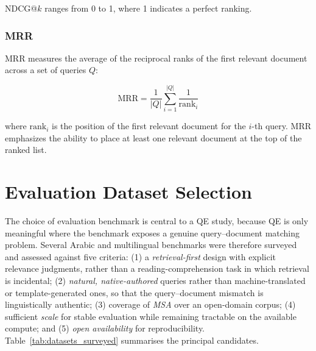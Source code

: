\noindent NDCG@$k$ ranges from 0 to 1, where 1 indicates a perfect ranking.

\subsubsection{MRR}
\label{sec:mrr_math}

MRR measures the average of the reciprocal ranks of the first relevant document across a set of queries $Q$:

\begin{equation}
\text{MRR} = \frac{1}{|Q|} \sum_{i=1}^{|Q|} \frac{1}{\text{rank}_i}
\label{eq:mrr}
\end{equation}

\noindent where $\text{rank}_i$ is the position of the first relevant document for the $i$-th query. MRR emphasizes the ability to place at least one relevant document at the top of the ranked list.

\section{Evaluation Dataset Selection}
\label{sec:dataset_selection}

The choice of evaluation benchmark is central to a QE study, because QE is only meaningful where the benchmark exposes a genuine query--document matching problem. Several Arabic and multilingual benchmarks were therefore surveyed and assessed against five criteria: (1) a \emph{retrieval-first} design with explicit relevance judgments, rather than a reading-comprehension task in which retrieval is incidental; (2) \emph{natural, native-authored} queries rather than machine-translated or template-generated ones, so that the query--document mismatch is linguistically authentic; (3) coverage of \emph{MSA} over an open-domain corpus; (4) sufficient \emph{scale} for stable evaluation while remaining tractable on the available compute; and (5) \emph{open availability} for reproducibility. Table~\ref{tab:datasets_surveyed} summarises the principal candidates.

